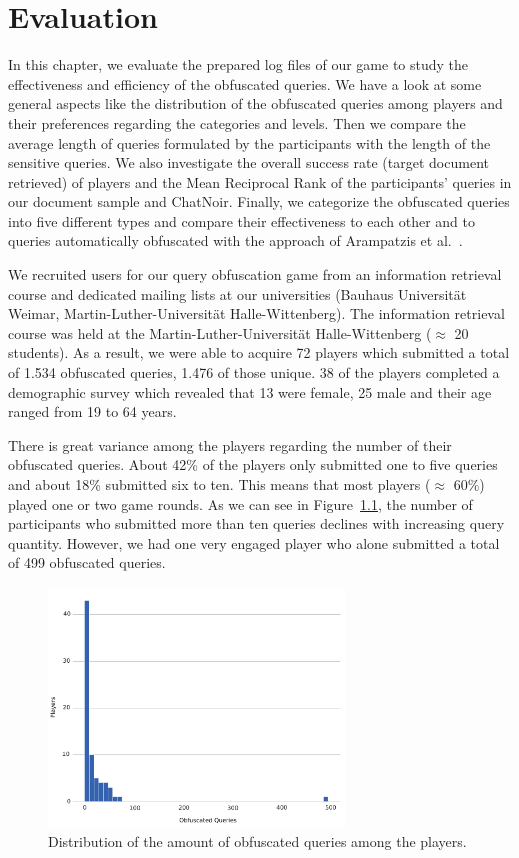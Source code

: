 \chapter{Evaluation}
In this chapter, we evaluate the prepared log files of our game to study the effectiveness and efficiency of the obfuscated queries. We have a look at some general aspects like the distribution of the obfuscated queries among players and their preferences regarding the categories and levels. Then we compare the average length of queries formulated by the participants with the length of the sensitive queries. We also investigate the overall success rate (target document retrieved) of players and the Mean Reciprocal Rank of the participants' queries in our document sample and ChatNoir. Finally, we categorize the obfuscated queries into five different types and compare their effectiveness to each other and to queries automatically obfuscated with the approach of Arampatzis et al.~\cite{arampatzis}.\par
We recruited users for our query obfuscation game from an information retrieval course and dedicated mailing lists at our universities (Bauhaus Universit{\"a}t Weimar, Martin-Luther-Universit{\"a}t Halle-Wittenberg). The information retrieval course was held at the Martin-Luther-Universit{\"a}t Halle-Wittenberg ($\approx$ 20 students). As a result, we were able to acquire 72 players which submitted a total of 1.534 obfuscated queries, 1.476 of those unique. 38 of the players completed a demographic survey which revealed that 13 were female, 25 male and their age ranged from 19 to 64 years.\par
There is great variance among the players regarding the number of their obfuscated queries. About 42\% of the players only submitted one to five queries and about 18\% submitted six to ten. This means that most players ($\approx$ 60\%) played one or two game rounds. As we can see in Figure~\ref{fig:distribution:num:queries}, the number of participants who submitted more than ten queries declines with increasing query quantity. However, we had one very engaged player who alone submitted a total of 499 obfuscated queries.  
\begin{figure}[h]
    \centering
    \includegraphics[width=0.7\textwidth]{graphics/evaluation/distribution_num_submitted_queries.pdf}
    \caption{Distribution of the amount of obfuscated queries among the players.}
    \label{fig:distribution:num:queries}
\end{figure}
